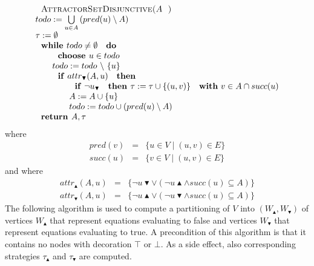 \begin{equation*}
\begin{array}{l}
\text{\textsc{AttractorSetDisjunctive(}}A\text{\textsc{)}} \\ 
todo:=\bigcup\limits_{u\in A}\left( pred(u)\setminus A\right)  \\ 
\tau :=\emptyset  \\ 
\text{\textbf{while }}todo\neq \emptyset \text{ \textbf{do}} \\ 
\qquad \text{\textbf{choose }}u\in todo \\ 
\qquad todo:=todo\ \backslash \ \{u\} \\ 
\qquad \text{\textbf{if} }attr_{\blacktriangledown }(A,u)\text{ \textbf{then}%
} \\ 
\qquad \qquad \text{\textbf{if} }\lnot u_{\blacktriangledown }\text{ \textbf{%
then }}\tau :=\tau \cup \{(u,v)\}\text{ \textbf{with} }v\in A\cap succ(u) \\ 
\qquad \qquad A:=A\cup \{u\} \\ 
\qquad \qquad todo:=todo\cup \left( pred(u)\setminus A\right)  \\ 
\text{\textbf{return }}A,\tau 
\end{array}%
\end{equation*}%
where%
\begin{eqnarray*}
pred(v) &=&\{u\in V\mid (u,v)\in E\} \\
succ(u) &=&\{v\in V\mid (u,v)\in E\}
\end{eqnarray*}%
and where%
\begin{eqnarray*}
attr_{\blacktriangle }(A,u) &=&\{\lnot u\blacktriangledown \vee \left( \lnot
u\blacktriangle \wedge succ(u)\subseteq A\right) \} \\
attr_{\blacktriangledown }(A,u) &=&\{\lnot u\blacktriangle \vee \left( \lnot
u\blacktriangledown \wedge succ(u)\subseteq A\right) \}
\end{eqnarray*}%
The following algorithm is used to compute a partitioning of $V$ into $%
\left( W_{\blacktriangle },W_{\blacktriangledown }\right) $ of vertices $%
W_{\blacktriangle }$ that represent equations evaluating to false and
vertices $W_{\blacktriangledown }$ that represent equations evaluating to
true. A precondition of this algorithm is that it contains no nodes with
decoration $\top $ or $\bot $. As a side effect, also corresponding
strategies $\tau _{\blacktriangle }$ and $\tau _{\blacktriangledown }$ are
computed.%
